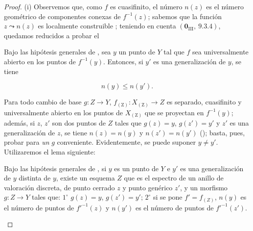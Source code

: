 \begin{proof}
(i)
Observemos que, como $f$ es cuasifinito, el número $n(z)$ es el número geométrico de componentes conexas de $f^{-1}(z)$; sabemos que la función $z\leadsto n(z)$ es localmente construible ; teniendo en cuenta $(\mathbf{0}_{\mathrm{III}},~9.3.4)$, quedamos reducidos a probar el

\begin{corollary}[15.5.2]
\label{IV.15.5.2}
Bajo las hipótesis generales de , sea $y$ un punto de $Y$ tal que $f$ sea universalmente abierto en los puntos de $f^{-1}(y)$.
Entonces, si $y'$ es una generalización de $y$, se tiene
\end{corollary}

\begin{equation}
\tag{15.5.2.1}
\label{IV.15.5.2.1}
  n(y) \leq n(y').
\end{equation}

Para todo cambio de base $g:Z\to Y$, $f_{(\mathrm{Z})}:X_{(\mathrm{Z})}\to Z$ es separado, cuasifinito y universalmente abierto en los puntos de $X_{(\mathrm{Z})}$ que se proyectan en $f^{-1}(y)$; además, si $z$, $z'$ son dos puntos de $Z$ tales que $g(z)=y$, $g(z')=y'$ y $z'$ es una generalización de $z$, se tiene $n(z)=n(y)$ y $n(z')=n(y')$ (); basta, pues, probar  para \emph{un} $g$ conveniente.
Evidentemente, se puede suponer $y\neq y'$.
Utilizaremos el lema siguiente:

\begin{lemma}[15.5.2.2]
\label{IV.15.5.2.2}
Bajo las hipótesis generales de , si $y$ es un punto de $Y$ e $y'$ es una generalización de $y$ distinta de $y$, existe un esquema $Z$ que es el espectro de un anillo de valoración discreta, de punto cerrado $z$ y punto genérico $z'$, y un morfismo $g:Z\to Y$ tales que:
$1^\circ$ $g(z)=y$, $g(z')=y'$;
$2^\circ$ si se pone $f'=f_{(Z)}$, $n(y)$ es el número de puntos de $f'^{-1}(z)$ y $n(y')$ es el número de puntos de $f'^{-1}(z')$.
\end{lemma}


\end{proof}
